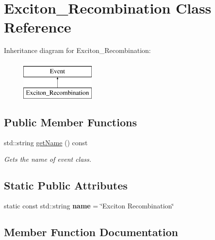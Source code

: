 \hypertarget{class_exciton___recombination}{}\section{Exciton\+\_\+\+Recombination Class Reference}
\label{class_exciton___recombination}
Inheritance diagram for Exciton\+\_\+\+Recombination\+:\begin{figure}[H]
\begin{center}
\leavevmode
\includegraphics[height=2.000000cm]{class_exciton___recombination}
\end{center}
\end{figure}
\subsection*{Public Member Functions}
\begin{DoxyCompactItemize}
\item 
std\+::string \hyperlink{class_exciton___recombination_ac4142920b4692cdc107b0e877c7c8310}{get\+Name} () const
\begin{DoxyCompactList}\small\item\em Gets the name of event class. \end{DoxyCompactList}\end{DoxyCompactItemize}
\subsection*{Static Public Attributes}
\begin{DoxyCompactItemize}
\item 
\mbox{\label{class_exciton___recombination_a601fbd52a90812058cb073fb57b1ad6f}} 
static const std\+::string {\bfseries name} = \char`\"{}Exciton Recombination\char`\"{}
\end{DoxyCompactItemize}


\subsection{Member Function Documentation}
\mbox{\label{class_exciton___recombination_ac4142920b4692cdc107b0e877c7c8310}} 
